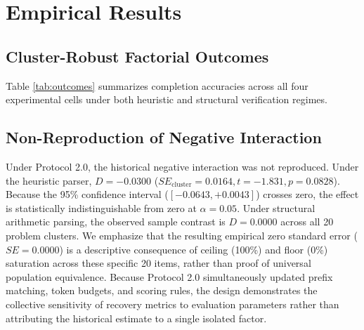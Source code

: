 \documentclass[10pt,conference]{IEEEtran}
\begin{document}
\section{Empirical Results}

\subsection{Cluster-Robust Factorial Outcomes}
Table \ref{tab:outcomes} summarizes completion accuracies across all four experimental cells under both heuristic and structural verification regimes.

\begin{table}[htbp]
\caption{Protocol 2.0 Factorial Outcomes ($N=400$ Rollouts, $C=20$ Clusters)}
\label{tab:outcomes}
\centering
{}
\end{table}

\subsection{Non-Reproduction of Negative Interaction}
Under Protocol 2.0, the historical negative interaction was not reproduced. Under the heuristic parser, $D = -0.0300$ ($SE_{\text{cluster}} = 0.0164, t = -1.831, p = 0.0828$). Because the 95\% confidence interval ($[-0.0643, +0.0043]$) crosses zero, the effect is statistically indistinguishable from zero at $\alpha = 0.05$. Under structural arithmetic parsing, the observed sample contrast is $D = 0.0000$ across all 20 problem clusters. We emphasize that the resulting empirical zero standard error ($SE = 0.0000$) is a descriptive consequence of ceiling (100\%) and floor (0\%) saturation across these specific 20 items, rather than proof of universal population equivalence. Because Protocol 2.0 simultaneously updated prefix matching, token budgets, and scoring rules, the design demonstrates the collective sensitivity of recovery metrics to evaluation parameters rather than attributing the historical estimate to a single isolated factor.
\end{document}
